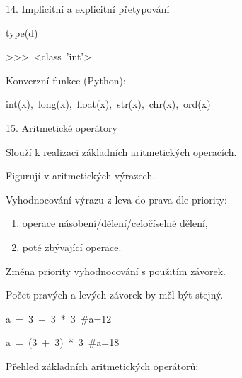 \documentclass[czech]{beamer}
\newenvironment{lyxcode}
  {\par\begin{list}{}{
    \setlength{\rightmargin}{\leftmargin}
    \setlength{\listparindent}{0pt}%
    \raggedright
    \setlength{\itemsep}{0pt}
    \setlength{\parsep}{0pt}
    \normalfont\ttfamily}%
   \def\{{\char`\{}
   \def\}{\char`\}}
   \def\textasciitilde{\char`\~}
   \item[]}
  {\end{list}}
\begin{document}
\begin{frame}[plain]{14. Implicitní a explicitní přetypování}
\begin{lyxcode}
{\scriptsize type(d)}{\scriptsize\par}

{\scriptsize >\textcompwordmark >\textcompwordmark >~<class~'int'>}{\scriptsize\par}
\end{lyxcode}
{\scriptsize Konverzní funkce (Python):}{\scriptsize\par}
\begin{lyxcode}
{\scriptsize int(x),~long(x),~float(x),~str(x),~chr(x),~ord(x)}{\scriptsize\par}
\end{lyxcode}
\end{frame}

\begin{frame}[plain]{15. Aritmetické operátory}

{\scriptsize Slouží k realizaci základních aritmetických operacích.}{\scriptsize\par}

{\scriptsize Figurují v aritmetických výrazech.\medskip{}
}{\scriptsize\par}

{\scriptsize Vyhodnocování výrazu z leva do prava dle priority: }{\scriptsize\par}
\begin{enumerate}
\item {\scriptsize operace násobení/dělení/celočíselné dělení, }{\scriptsize\par}
\item {\scriptsize poté zbývající operace.\medskip{}
}{\scriptsize\par}
\end{enumerate}
{\scriptsize Změna priority vyhodnocování s použitím závorek.}{\scriptsize\par}

{\scriptsize Počet pravých a levých závorek by měl být stejný.}{\scriptsize\par}
\begin{lyxcode}
{\scriptsize a~=~3~+~3~{*}~3~\#a=12}{\scriptsize\par}

{\scriptsize a~=~(3~+~3)~{*}~3~\#a=18}{\scriptsize\par}
\end{lyxcode}
{\scriptsize Přehled základních aritmetických operátorů:}


\end{frame}
\end{document}
